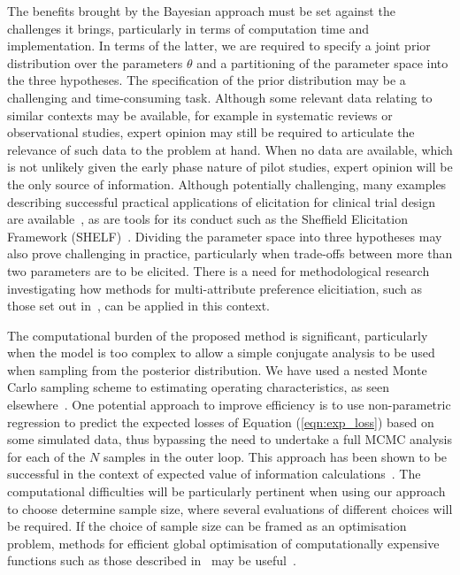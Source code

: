 \documentclass{article} %
\begin{document}
The benefits brought by the Bayesian approach must be set against the challenges it brings, particularly in terms of computation time and implementation. In terms of the latter, we are required to specify a joint prior distribution over the parameters $\theta$ and a partitioning of the parameter space into the three hypotheses. The specification of the prior distribution may be a challenging and time-consuming task. Although some relevant data relating to similar contexts may be available, for example in systematic reviews or observational studies, expert opinion may still be required to articulate the relevance of such data to the problem at hand. When no data are available, which is not unlikely given the early phase nature of pilot studies, expert opinion will be the only source of information. Although potentially challenging, many examples describing successful practical applications of elicitation for clinical trial design are available~\cite{Walley2015, Crisp2018, Dallow2018}, as are tools for its conduct such as the Sheffield Elicitation Framework (SHELF)~\cite{OHagan2006a}. Dividing the parameter space into three hypotheses may also prove challenging in practice, particularly when trade-offs between more than two parameters are to be elicited. There is a need for methodological research investigating how methods for multi-attribute preference elicitiation, such as those set out in~\cite{Keeney1976}, can be applied in this context. 


The computational burden of the proposed method is significant, particularly when the model is too complex to allow a simple conjugate analysis to be used when sampling from the posterior distribution. We have used a nested Monte Carlo sampling scheme to estimating operating characteristics, as seen elsewhere~\cite{Wang2002, OHagan2005, Sutton2007}. One potential approach to improve efficiency is to use non-parametric regression to predict the expected losses of Equation (\ref{eqn:exp_loss}) based on some simulated data, thus bypassing the need to undertake a full MCMC analysis for each of the $N$ samples in the outer loop. This approach has been shown to be successful in the context of expected value of information calculations~\cite{Strong2014, Strong2015}. The computational difficulties will be particularly pertinent when using our approach to choose determine sample size, where several evaluations of different choices will be required. If the choice of sample size can be framed as an optimisation problem, methods for efficient global optimisation of computationally expensive functions such as those described in~\cite{Jones2001, Roustant2012} may be useful~\cite{Wilson2015}.
\end{document}
